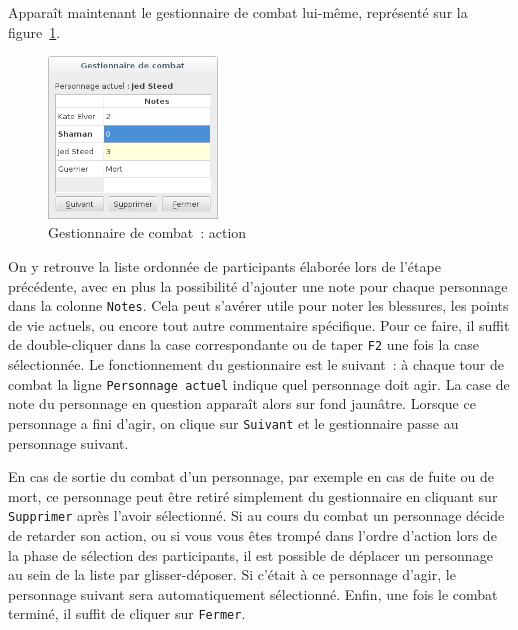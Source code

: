 \documentclass[a4paper,12pt]{article}
\newcommand*{\interfaceitem}[1]{\texttt{#1}}
\begin{document}
Apparaît maintenant le gestionnaire de combat lui-même, représenté sur la figure~\ref{gestion_combat_fight}.
\begin{figure}[ht]
    \centerline{\includegraphics[width=0.4\textwidth]{gestion_combat_fight}}
    \caption{Gestionnaire de combat~: action}
    \label{gestion_combat_fight}
\end{figure}
On y retrouve la liste ordonnée de participants élaborée lors de l'étape précédente, avec en plus la possibilité d'ajouter une note pour chaque personnage dans la colonne \interfaceitem{Notes}.
Cela peut s'avérer utile pour noter les blessures, les points de vie actuels, ou encore tout autre commentaire spécifique.
Pour ce faire, il suffit de double-cliquer dans la case correspondante ou de taper \interfaceitem{F2} une fois la case sélectionnée.
Le fonctionnement du gestionnaire est le suivant~: à chaque tour de combat la ligne \interfaceitem{Personnage actuel} indique quel personnage doit agir.
La case de note du personnage en question apparaît alors sur fond jaunâtre.
Lorsque ce personnage a fini d'agir, on clique sur \interfaceitem{Suivant} et le gestionnaire passe au personnage suivant.

En cas de sortie du combat d'un personnage, par exemple en cas de fuite ou de mort, ce personnage peut être retiré simplement du gestionnaire en cliquant sur \interfaceitem{Supprimer} après l'avoir sélectionné.
Si au cours du combat un personnage décide de retarder son action, ou si vous vous êtes trompé dans l'ordre d'action lors de la phase de sélection des participants, il est possible de déplacer un personnage au sein de la liste par glisser-déposer.
Si c'était à ce personnage d'agir, le personnage suivant sera automatiquement sélectionné.
Enfin, une fois le combat terminé, il suffit de cliquer sur \interfaceitem{Fermer}.
\end{document}
